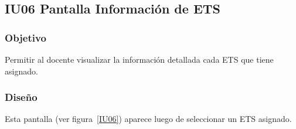 \subsection{IU06 Pantalla Información de ETS}

\newpage

\subsubsection{Objetivo}
Permitir al docente visualizar la información detallada cada ETS que tiene asignado.

\subsubsection{Diseño}
Esta pantalla  (ver figura~\ref{IU06}) aparece luego de seleccionar un ETS asignado.



